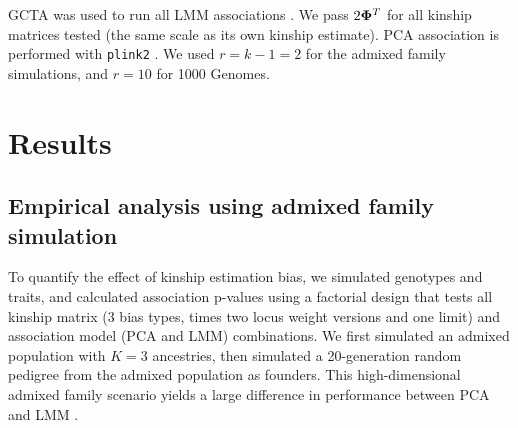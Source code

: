 \documentclass[11pt]{article}
\newcommand{\kinMat}[1][T]{%
  \ensuremath{%
    \mathbf{\Phi}^{#1}
  }%
  \xspace%
}%
\begin{document}
GCTA was used to run all LMM associations \citep{yang_gcta:_2011, yang_advantages_2014}. We pass $2 \kinMat$ for all kinship matrices tested (the same scale as its own kinship estimate).
PCA association is performed with \texttt{plink2} \citep{chang_second-generation_2015}.
We used $r=k-1=2$ for the admixed family simulations, and $r=10$ for 1000 Genomes.

\section{Results}

\graphicspath{ {../data/} }

\subsection{Empirical analysis using admixed family simulation}

To quantify the effect of kinship estimation bias, we simulated genotypes and traits, and calculated association p-values using a factorial design that tests all kinship matrix (3 bias types, times two locus weight versions and one limit) and association model (PCA and LMM) combinations.
We first simulated an admixed population with $K=3$ ancestries, then simulated a 20-generation random pedigree from the admixed population as founders.
This high-dimensional admixed family scenario yields a large difference in performance between PCA and LMM \citep{yao_limitations_2022}.
\end{document}
